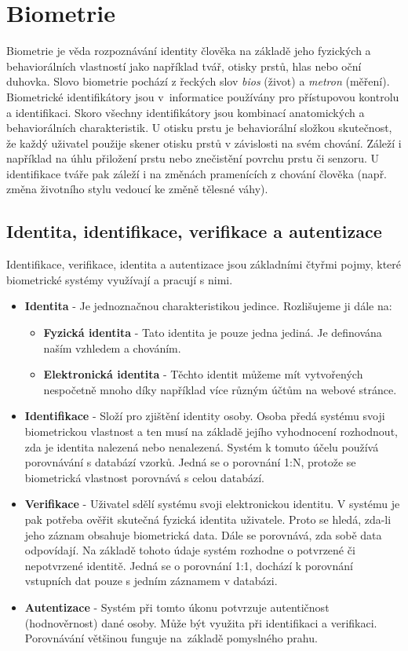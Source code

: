 \chapter{Biometrie} 
Biometrie je věda rozpoznávání identity člověka na základě jeho fyzických a behaviorálních vlastností jako například tvář, otisky prstů, hlas nebo oční duhovka. \cite{Jain2008} Slovo biometrie pochází z řeckých slov \textit{bios} (život) a \textit{metron} (měření). Biometrické identifikátory jsou v~informatice používány pro přístupovou kontrolu a identifikaci. Skoro všechny identifikátory jsou kombinací anatomických a behaviorálních charakteristik. U otisku prstu je behaviorální složkou skutečnost, že každý uživatel použije skener otisku prstů v závislosti na svém chování. Záleží i například na úhlu přiložení prstu nebo znečistění povrchu prstu či senzoru. U identifikace tváře pak záleží i na změnách pramenících z chování člověka (např. změna životního stylu vedoucí ke změně tělesné váhy). \cite{Maltoni2009}
\section{Identita, identifikace, verifikace a autentizace}
Identifikace, verifikace, identita a autentizace jsou základními čtyřmi pojmy, které biometrické systémy využívají a pracují s nimi. \cite{Drahansky}
\begin{itemize}
    \item \textbf{Identita} - Je jednoznačnou charakteristikou jedince. Rozlišujeme ji dále na:
        \begin{itemize}
            \item \textbf{Fyzická identita} - Tato identita je pouze jedna jediná. Je definována naším vzhledem a chováním.
            \item \textbf{Elektronická identita} - Těchto identit můžeme mít vytvořených nespočetně mnoho díky například více různým účtům na webové stránce.
        \end{itemize}
    \item \textbf{Identifikace} - Složí pro zjištění identity osoby. Osoba předá systému svoji biometrickou vlastnost a ten musí na základě jejího vyhodnocení rozhodnout, zda je identita nalezená nebo nenalezená. Systém k tomuto účelu používá porovnávání s databází vzorků. Jedná se o porovnání 1:N, protože se biometrická vlastnost porovnává s celou databází.
    \item \textbf{Verifikace} - Uživatel sdělí systému svoji elektronickou identitu. V systému je pak potřeba ověřit skutečná fyzická identita uživatele. Proto se hledá, zda-li jeho záznam obsahuje biometrická data. Dále se porovnává, zda sobě data odpovídají. Na základě tohoto údaje systém rozhodne o potvrzené či nepotvrzené identitě. Jedná se o porovnání 1:1, dochází k porovnání vstupních dat pouze s jedním záznamem v databázi.
    \item \textbf{Autentizace} - Systém při tomto úkonu potvrzuje autentičnost (hodnověrnost) dané osoby. Může být využita při identifikaci a verifikaci. Porovnávání většinou funguje na~základě pomyslného prahu.
\end{itemize}

